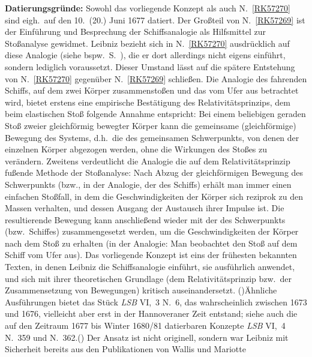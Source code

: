 \begin{ledgroup}
\footnotesize
\pstart
\noindent%
\textbf{Datierungsgründe:}
Sowohl das vorliegende Konzept als auch N.~\ref{RK57270} sind eigh.\ auf den 10.\ (20.) Juni 1677 datiert.
%
Der Großteil von N.~\ref{RK57269} ist der Einführung und Besprechung der Schiffsanalogie als 
%
Hilfsmittel zur Stoßanalyse gewidmet.
%
Leibniz bezieht sich in N.~\ref{RK57270} ausdrücklich auf diese Analogie
%
(siehe bspw.\ S.~),
%
die er dort allerdings nicht eigens einführt, sondern lediglich voraussetzt.
%
Dieser Umstand lässt auf die spätere Entstehung von N.~\ref{RK57270} gegenüber N.~\ref{RK57269} schließen.%
\pend
%
%
\pstart
Die Analogie des fahrenden Schiffs, auf dem zwei Körper zusammenstoßen und das vom Ufer aus betrachtet wird, 
%
bietet erstens eine empirische Bestätigung des Relativitätsprinzips, dem beim elastischen Stoß folgende Annahme entspricht:
%
Bei einem beliebigen geraden Stoß zweier gleichförmig bewegter Körper
%
kann die gemeinsame (gleichförmige) Bewegung des Systems, d.h.\ die des gemeinsamen Schwerpunkts, 
%
von denen der einzelnen Körper abgezogen werden,
%
ohne die Wirkungen des Stoßes zu verändern.
%
Zweitens verdeutlicht die Analogie die auf dem Relativitätsprinzip fußende Methode der Stoßanalyse:
%
Nach Abzug der gleichförmigen Bewegung des Schwerpunkts
%
(bzw., in der Analogie, der des Schiffs)
%
erhält man immer einen einfachen Stoßfall, in dem die Geschwindigkeiten der Körper sich reziprok zu den Massen verhalten, 
%
und dessen Ausgang der Austausch ihrer Impulse ist.
%
%
Die resultierende Bewegung kann anschließend wieder mit der des Schwerpunkts (bzw.\ Schiffes) zusammengesetzt werden,
%
um die Geschwindigkeiten der Körper nach dem Stoß zu erhalten
%
(in der Analogie: Man beobachtet den Stoß auf dem Schiff vom Ufer aus).
%
%
\pend
%
\pstart
%
Das vorliegende Konzept ist eins der frühesten bekannten Texten, in denen Leibniz die Schiffsanalogie einführt, 
%
sie ausführlich anwendet, 
%
und sich mit ihrer theoretischen Grundlage 
%
(dem Relativitätsprinzip bzw.\ der Zusammensetzung von Bewegungen) kritisch auseinandersetzt.
%
(\protect\vphantom)Ähnliche Ausführungen bietet das Stück \textit{LSB} VI,~3 N.~6, 
das wahrscheinlich zwischen 1673 und 1676, vielleicht aber erst in der Hannoveraner Zeit entstand; 
siehe auch die auf den Zeitraum 1677 bis Winter 1680/81 datierbaren Konzepte 
\textit{LSB} VI,~4 N.~359 und N.~362.\protect\vphantom()
%
Der Ansatz ist nicht originell,
%
sondern war Leibniz mit Sicherheit bereits aus den Publikationen von \protect{}Wallis und \protect{}Mariotte

\end{ledgroup}
